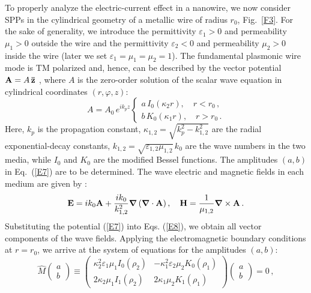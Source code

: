 \documentclass[9pt,twocolumn,twoside]{osajnl}
\begin{document}
To properly analyze the electric-current effect in a nanowire, we now consider SPPs in the cylindrical geometry of a metallic wire of radius $r_0$, Fig.~\ref{F3}. For the sake of generality, we introduce the permittivity $\varepsilon_1 >0$ and permeability $\mu_1 >0$ outside the wire and the permittivity $\varepsilon_2 <0$ and permeability $\mu_2 >0$ inside the wire (later we set ${\varepsilon_1} = {\mu_1} = {\mu_2} = 1$). The fundamental plasmonic wire mode is TM polarized and, hence, can be described by the vector potential ${\bf{A}} = A\,{\bf{\bar z}}$ \cite{Balanis}, where $A$ is the zero-order solution of the scalar wave equation in cylindrical coordinates $\left( {r,\varphi ,z} \right)$:
%
\begin{equation}
A = A_0\, {e^{i{k_p}z}}\left\{ {\begin{array}{*{20}{c}}
{a\,{I_0 }\!\left( {{\kappa _2}r} \right),\quad r < {r_0}}\, , \\
{b\,{K_0 }\!\left( {{\kappa _1}r} \right),\quad r > {r_0}}\, .
\end{array}} \right.
\label{E7}
\end{equation}
%
Here, $k_p$ is the propagation constant, ${\kappa _{1,2}} = \sqrt {k_p^2 - k_{1,2}^2}$ are the radial exponential-decay constants, ${k_{1,2}} = \sqrt {{\varepsilon _{1,2}}{\mu _{1,2}}} \,{k_0}$ are the wave numbers in the two media, while $I_0$ and $K_0$ are the modified Bessel functions. The amplitudes  $(a,b)$ in Eq.~(\ref{E7}) are to be determined. The wave electric and magnetic fields in each medium are given by \cite{Balanis}:
%
\begin{eqnarray}
{\bf{E}} = i{k_0}{\bf{A}} + \frac{{i {k_0}}}{{k_{1,2}^2}}\bm{\nabla} \left( {\bm{\nabla}  \cdot {\bf{A}}} \right) , \quad
{\bf{H}} = \frac{1}{{{\mu _{1,2}}}}\bm{\nabla}  \times {\bf{A}}\, .
\label{E8}
\end{eqnarray}
%
Substituting the potential (\ref{E7}) into Eqs. (\ref{E8}), we obtain all vector components of the wave fields. Applying the electromagnetic boundary conditions at $r=r_0$, we arrive at the system of equations for the amplitudes $(a,b)$:
%
\begin{equation}
\hat M\! \left( {\begin{array}{*{20}{c}}
a\\
b
\end{array}} \right) \! \equiv \! \left( {\begin{array}{*{20}{c}}
{\kappa _2^2{\varepsilon _1}{\mu _1}{I_0}\!\left( {{\rho _2}} \right)}&{ - \kappa _1^2{\varepsilon _2}{\mu _2}{K_0}\! \left( {{\rho _1}} \right)}\\
{2{\kappa _2}{\mu _1}{I_1}\! \left( {{\rho _2}} \right)}&{2{\kappa _1}{\mu _2}{K_1}\! \left( {{\rho _1}} \right)}
\end{array}} \right)\! \left( {\begin{array}{*{20}{c}}
a\\
b
\end{array}} \right) \!=\! 0\, ,
\label{E9}
\end{equation}
\end{document}
